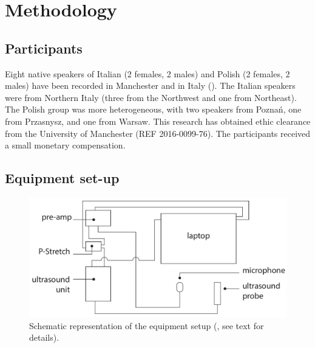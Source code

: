 \documentclass[authoryear, twocolumn]{elsarticle}
\begin{document}
\section{Methodology}\label{methodology}

\subsection{Participants}\label{participants}


Eight native speakers of Italian (2 females, 2 males) and Polish (2
females, 2 males) have been recorded in Manchester and in Italy
(). The Italian speakers were from Northern Italy
(three from the Northwest and one from Northeast). The Polish group was
more heterogeneous, with two speakers from Poznań, one from Przasnysz,
and one from Warsaw. This research has obtained ethic clearance from the
University of Manchester (REF 2016-0099-76). The participants received a
small monetary compensation.

\subsection{Equipment set-up}\label{equipment-set-up}

\begin{figure}
    \centering
    \includegraphics[width=.7\textwidth]{../../graphics/uti-setup.pdf}
    \caption{Schematic representation of the equipment setup (\citealt{articulate2011}, see text for details).}
    \label{f:uti-setup}
\end{figure}
\end{document}
